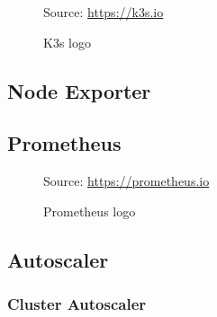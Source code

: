\begin{figure} %
  \centering
  \def\stackalignment{r} %
  {\scriptsize \parbox[t]{\linewidth}{ Source: \url{https://k3s.io}} }
  \caption{K3s logo}
\end{figure}

\subsection{Node Exporter}
\label{subsec:implementation_dependencies_node_exporter}

\subsection{Prometheus}
\label{subsec:implementation_dependencies_prometheus}

\begin{figure} %
  \centering
  \def\stackalignment{r} %
  {\scriptsize \parbox[t]{\linewidth}{ Source: \url{https://prometheus.io}} }
  \caption{Prometheus logo}
\end{figure}

\subsection{Autoscaler}
\label{subsec:implementation_dependencies_autoscaler}

\subsubsection{Cluster Autoscaler}
\label{subsec:implementation_dependencies_autoscaler_cluster_autoscaler}

